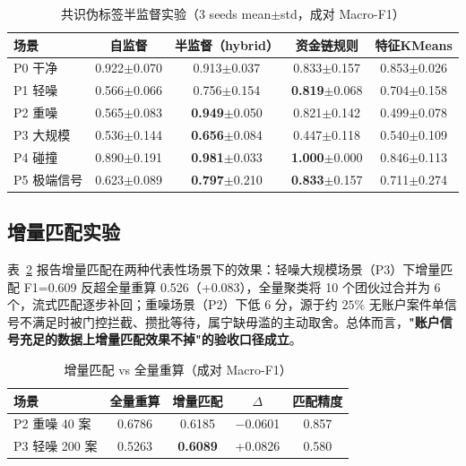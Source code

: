 \documentclass[12pt,a4paper,fontset=windows]{ctexart}
\begin{document}
\begin{table}[H]
  \centering
  \caption{共识伪标签半监督实验（3 seeds mean$\pm$std，成对 Macro-F1）}
  \label{tab:semi}
  \begin{tabular}{lcccc}
    \toprule
    场景 & 自监督 & 半监督（hybrid） & 资金链规则 & 特征KMeans \\
    \midrule
    P0 干净 & 0.922$\pm$0.070 & 0.913$\pm$0.037 & 0.833$\pm$0.157 & 0.853$\pm$0.026 \\
    P1 轻噪 & 0.566$\pm$0.066 & 0.756$\pm$0.154 & \textbf{0.819}$\pm$0.068 & 0.704$\pm$0.158 \\
    P2 重噪 & 0.565$\pm$0.083 & \textbf{0.949}$\pm$0.050 & 0.821$\pm$0.142 & 0.499$\pm$0.078 \\
    P3 大规模 & 0.536$\pm$0.144 & \textbf{0.656}$\pm$0.084 & 0.447$\pm$0.118 & 0.540$\pm$0.109 \\
    P4 碰撞 & 0.890$\pm$0.191 & \textbf{0.981}$\pm$0.033 & \textbf{1.000}$\pm$0.000 & 0.846$\pm$0.113 \\
    P5 极端信号 & 0.623$\pm$0.089 & \textbf{0.797}$\pm$0.210 & \textbf{0.833}$\pm$0.157 & 0.711$\pm$0.274 \\
    \bottomrule
  \end{tabular}
\end{table}

\subsection{增量匹配实验}

表~\ref{tab:incr} 报告增量匹配在两种代表性场景下的效果：轻噪大规模场景（P3）下增量匹配 F1=0.609 反超全量重算 0.526（+0.083），全量聚类将 10 个团伙过合并为 6 个，流式匹配逐步补回；重噪场景（P2）下低 6 分，源于约 $25\%$ 无账户案件单信号不满足时被门控拦截、攒批等待，属宁缺毋滥的主动取舍。总体而言，\textbf{"账户信号充足的数据上增量匹配效果不掉"的验收口径成立}。

\begin{table}[H]
  \centering
  \caption{增量匹配 vs 全量重算（成对 Macro-F1）}
  \label{tab:incr}
  \begin{tabular}{lcccc}
    \toprule
    场景 & 全量重算 & 增量匹配 & $\Delta$ & 匹配精度 \\
    \midrule
    P2 重噪 40 案 & 0.6786 & 0.6185 & $-$0.0601 & 0.857 \\
    P3 轻噪 200 案 & 0.5263 & \textbf{0.6089} & +0.0826 & 0.580 \\
    \bottomrule
  \end{tabular}
\end{table}
\end{document}

